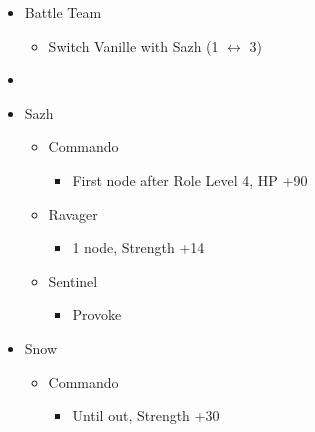 \begin{menu}
\begin{multicols}{2}
\begin{itemize}
    \paradigm
    \begin{itemize}
        \item Battle Team
        \begin{itemize}
            \item Switch Vanille with Sazh (1 $\leftrightarrow$ 3)
        \end{itemize}
        \item {}%
{\paradigmline{\com}{\com}{\med}}%
{\paradigmline{\com}{\com}{(\com)}}%
{\paradigmline{(\rav)}{(\rav)}{(\med)}}%
{\paradigmline[4]{\textit{\com}}{\textit{\rav}}{\textit(\sab)}}%
{\paradigmline{\rav}{\rav}{\sab}}%
{\paradigmline{\rav}{\rav}{\rav}}
    \end{itemize}
    \crystarium
    \begin{itemize}
        \item Sazh
        \begin{itemize}
            \item Commando
            \begin{itemize}
                \item First node after Role Level 4, HP +90
            \end{itemize}
            \item Ravager
            \begin{itemize}
                \item 1 node, Strength +14
            \end{itemize}
            \item Sentinel
            \begin{itemize}
                \item Provoke
            \end{itemize}
        \end{itemize}
        \item Snow
        \begin{itemize}
            \item Commando
            \begin{itemize}
                \item Until out, Strength +30
            \end{itemize}
        \end{itemize}
    \end{itemize}

\end{itemize}
\end{multicols}
\end{menu}
